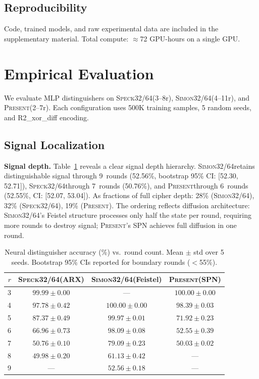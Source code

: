 \documentclass[runningheads]{llncs}
\newcommand{\speck}{\textsc{Speck32/64}}
\newcommand{\simon}{\textsc{Simon32/64}}
\newcommand{\present}{\textsc{Present}}
\begin{document}
\subsection{Reproducibility}

Code, trained models, and raw experimental data are included in the supplementary material.
Total compute: $\approx$72 GPU-hours on a single GPU.


\section{Empirical Evaluation}
\label{sec:experiments}

We evaluate MLP distinguishers on \speck (3--8r), \simon (4--11r), and \present (2--7r).
Each configuration uses 500K training samples, 5 random seeds, and R2\_xor\_diff encoding.

\subsection{Signal Localization}
\label{sec:exp-representation}

\textbf{Signal depth.}
Table~\ref{tab:baseline} reveals a clear signal depth hierarchy.
\simon retains distinguishable signal through 9~rounds (52.56\%, bootstrap 95\% CI: [52.30, 52.71]), \speck through 7~rounds (50.76\%), and \present through 6~rounds (52.55\%, CI: [52.07, 53.04]).
As fractions of full cipher depth: 28\% (\simon), 32\% (\speck), 19\% (\present).
The ordering reflects diffusion architecture: \simon's Feistel structure processes only half the state per round, requiring more rounds to destroy signal; \present's SPN achieves full diffusion in one round.

\begin{table}[htbp]
\centering
\caption{Neural distinguisher accuracy (\%) vs.\ round count.
         Mean $\pm$ std over 5 seeds.
         Bootstrap 95\% CIs reported for boundary rounds ($<$55\%).}\label{tab:baseline}
\begin{tabular}{@{}rccc@{}}
\toprule
$r$ & \textbf{\speck (ARX)} & \textbf{\simon (Feistel)} & \textbf{\present (SPN)} \\
\midrule
3  & $99.99 \pm 0.00$  & ---                & $100.00 \pm 0.00$ \\
4  & $97.78 \pm 0.42$  & $100.00 \pm 0.00$  & $98.39 \pm 0.03$ \\
5  & $87.37 \pm 0.49$  & $99.97 \pm 0.01$   & $71.92 \pm 0.23$ \\
6  & $66.96 \pm 0.73$  & $98.09 \pm 0.08$   & $52.55 \pm 0.39$ \\
7  & $50.76 \pm 0.10$  & $79.09 \pm 0.23$   & $50.03 \pm 0.02$ \\
8  & $49.98 \pm 0.20$  & $61.13 \pm 0.42$   & --- \\
9  & ---               & $52.56 \pm 0.18$   & --- \\
\bottomrule
\end{tabular}
\end{table}
\end{document}
